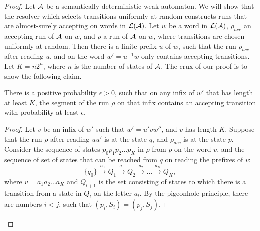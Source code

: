 \lemmasdweakismr*
\begin{proof}
    Let $\mathcal{A}$ be a semantically deterministic weak automaton. We will show that the resolver which selects transitions uniformly at random constructs runs that are almost-surely accepting on words in $\mathcal{L}(\mathcal{A})$. Let $w$ be a word in $\mathcal{L}(\mathcal{A})$, $\rho_{acc}$ an accepting run of $\mathcal{A}$ on $w$, and $\rho$ a run of $\mathcal{A}$ on $w$, where transitions are chosen uniformly at random. Then there is a finite prefix $u$ of $w$, such that the run $\rho_{acc}$ after reading $u$, and on the word $w'=u^{-1}w$ only contains accepting transitions. Let $K=n2^n$, where $n$ is the number of states of $\mathcal{A}$. The crux of our proof is to show the following claim.
 \begin{claim}\label{claim:claiminsdweakismr}
        There is a positive probability $\epsilon>0$, such that on any infix of $w'$ that has length at least $K$, the segment of the run $\rho$ on that infix contains an accepting transition with probability at least $\epsilon$.
    \end{claim}
    \begin{proof}
        Let $v$ be an infix of $w'$ such that $w'=u'vw''$, and $v$ has length $K$. Suppose that the run $\rho$ after reading $uu'$ is at the state $q$, and $\rho_{acc}$ is at the state $p$. Consider the sequence of states $p_0p_1p_2\dots p_K$ in $\rho$ from $p$ on the word $v$, and the sequence of set of states that can be reached from $q$ on reading the prefixes of $v$:
        $$\{q_0\} \xrightarrow{a_0} Q_1 \xrightarrow{a_1} Q_2 \xrightarrow{a_2} \dots \xrightarrow{a_K} Q_K,$$ where $v=a_1a_2\dots a_K$ and $Q_{l+1}$ is the set consisting of states to which there is a transition from a state in $Q_l$ on the letter $a_l$.  By the pigeonhole principle, there are numbers $i<j$, such that $(p_i,S_i)=(p_j,S_j)$. 
        

\end{proof}
\end{proof}
